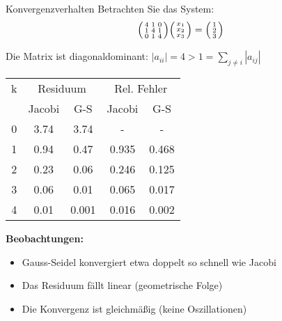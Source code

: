 \begin{example2}{Konvergenzverhalten}
Betrachten Sie das System:
$$\begin{psmallmatrix}
4 & 1 & 0\\
1 & 4 & 1\\
0 & 1 & 4
\end{psmallmatrix}
\begin{psmallmatrix}
x_1\\
x_2\\
x_3
\end{psmallmatrix} =
\begin{psmallmatrix}
1\\
2\\
3
\end{psmallmatrix}$$

Die Matrix ist diagonaldominant:
$|a_{ii}| = 4 > 1 = \sum_{j\neq i} |a_{ij}|$

\begin{center}
\begin{tabular}{c|cc|cc}
k & \multicolumn{2}{c|}{Residuum} & \multicolumn{2}{c}{Rel. Fehler}\\
& Jacobi & G-S & Jacobi & G-S\\
\hline
0 & 3.74 & 3.74 & - & -\\
1 & 0.94 & 0.47 & 0.935 & 0.468\\
2 & 0.23 & 0.06 & 0.246 & 0.125\\
3 & 0.06 & 0.01 & 0.065 & 0.017\\
4 & 0.01 & 0.001 & 0.016 & 0.002
\end{tabular}
\end{center}

\textbf{Beobachtungen:}
\begin{itemize}
    \item Gauss-Seidel konvergiert etwa doppelt so schnell wie Jacobi
    \item Das Residuum fällt linear (geometrische Folge)
    \item Die Konvergenz ist gleichmäßig (keine Oszillationen)
\end{itemize}
\end{example2}